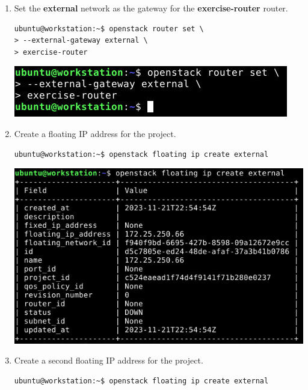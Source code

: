 \documentclass[letterpaper, 12pt]{article}
\begin{document}
\begin{enumerate}
    \item Set the \textbf{external} network as the gateway for the \textbf{exercise-router} router.
\begin{lstlisting}
ubuntu@workstation:~$ openstack router set \
> --external-gateway external \
> exercise-router
\end{lstlisting}

    \begin{center}
        \includegraphics[width=\linewidth]{images/part5/step4.png}
    \end{center}

    \item Create a floating IP address for the project.
\begin{lstlisting}
ubuntu@workstation:~$ openstack floating ip create external
\end{lstlisting}

    \begin{center}
        \includegraphics[width=\linewidth]{images/part5/step5.png}
    \end{center}

    \item Create a second floating IP address for the project.
\begin{lstlisting}
ubuntu@workstation:~$ openstack floating ip create external
\end{lstlisting}


\end{enumerate}
\end{document}
